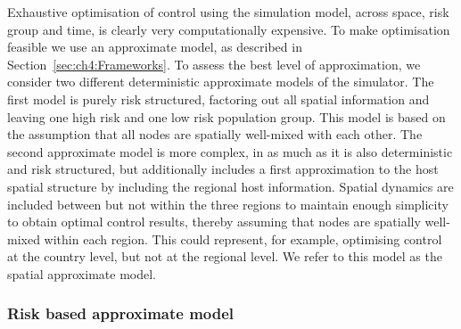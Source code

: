 Exhaustive optimisation of control using the simulation model, across space, risk group and time, is clearly very computationally expensive. To make optimisation feasible we use an approximate model, as described in Section~\ref{sec:ch4:Frameworks}. To assess the best level of approximation, we consider two different deterministic approximate models of the simulator. The first model is purely risk structured, factoring out all spatial information and leaving one high risk and one low risk population group. This model is based on the assumption that all nodes are spatially well-mixed with each other. The second approximate model is more complex, in as much as it is also deterministic and risk structured, but additionally includes a first approximation to the host spatial structure by including the regional host information. Spatial dynamics are included between but not within the three regions to maintain enough simplicity to obtain optimal control results, thereby assuming that nodes are spatially well-mixed within each region. This could represent, for example, optimising control at the country level, but not at the regional level. We refer to this model as the spatial approximate model.

\subsubsection*{Risk based approximate model}

